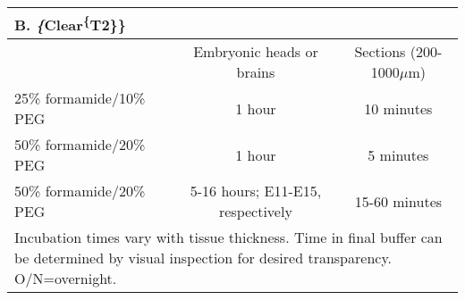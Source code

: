 \begin{table}[hbtp]
\begin{center}
\begin{tabular}{lcccc}
\multicolumn{5}{l}{B. \emph\{Clear\textsuperscript\{T2\}\}}                                                                                                           \\ \hline
                            & \multicolumn{2}{c}{Embryonic heads or brains}                                & \multicolumn{2}{c}{Sections (200-1000$\mu$m)}            \\ \hline
25\% formamide/10\% PEG     & \multicolumn{2}{c}{1 hour}                                                   & \multicolumn{2}{c}{10 minutes}                           \\
50\% formamide/20\% PEG     & \multicolumn{2}{c}{1 hour}                                                   & \multicolumn{2}{c}{5 minutes}                            \\
50\% formamide/20\% PEG     & \multicolumn{2}{c}{5-16 hours; E11-E15, respectively}                        & \multicolumn{2}{c}{15-60 minutes}                        \\ \hline
\multicolumn{5}{l}{Incubation times vary with tissue thickness. Time in final buffer can be determined by visual inspection for desired transparency. O/N=overnight.}
\end{tabular}
\end{center}
\end{table}

